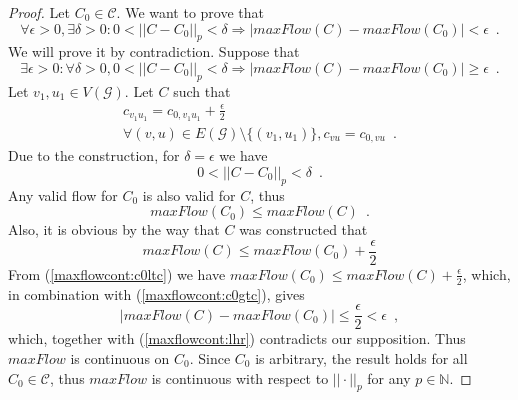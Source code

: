 \begin{proof}
   Let $C_0 \in \mathcal{C}$. We want to prove that
   \begin{equation*}
      \forall \epsilon > 0, \exists \delta > 0 : 0 < ||C - C_0||_p < \delta
      \Rightarrow |maxFlow\left(C\right) - maxFlow\left(C_0\right)| < \epsilon \enspace.
   \end{equation*}
   We will prove it by contradiction. Suppose that
   \begin{equation*}
      \exists \epsilon > 0 : \forall \delta > 0, 0 < ||C - C_0||_p < \delta
      \Rightarrow |maxFlow\left(C\right) - maxFlow\left(C_0\right)| \geq \epsilon \enspace.
   \end{equation*}
   Let $v_1, u_1 \in V\left(\mathcal{G}\right)$. Let $C$ such that
   \begin{equation*}
   \begin{gathered}
      c_{v_1u_1} = c_{0,v_1u_1} + \frac{\epsilon}{2} \\
      \forall \left(v, u\right) \in E\left(\mathcal{G}\right) \setminus \{\left(v_1, u_1\right)\}, c_{vu} = c_{0,vu}
      \enspace.
   \end{gathered}
   \end{equation*}
   Due to the construction, for $\delta = \epsilon$ we have
   \begin{equation}
   \label{maxflowcont:lhr}
      0 < ||C - C_0||_p < \delta \enspace.
   \end{equation}
   Any valid flow for $C_0$ is also valid for $C$, thus
   \begin{equation}
   \label{maxflowcont:c0ltc}
      maxFlow\left(C_0\right) \leq maxFlow\left(C\right) \enspace.
   \end{equation}
   Also, it is obvious by the way that $C$ was constructed that
   \begin{equation}
   \label{maxflowcont:c0gtc}
      maxFlow\left(C\right) \leq maxFlow\left(C_0\right) + \frac{\epsilon}{2}
   \end{equation}
   From (\ref{maxflowcont:c0ltc}) we have $maxFlow\left(C_0\right) \leq maxFlow\left(C\right) + \frac{\epsilon}{2}$, which,
   in combination with (\ref{maxflowcont:c0gtc}), gives 
   \begin{equation*}
      |maxFlow\left(C\right) - maxFlow\left(C_0\right)| \leq \frac{\epsilon}{2} < \epsilon \enspace,
   \end{equation*}
   which, together with (\ref{maxflowcont:lhr}) contradicts our supposition. Thus $maxFlow$ is continuous on $C_0$. Since
   $C_0$ is arbitrary, the result holds for all $C_0 \in \mathcal{C}$, thus $maxFlow$ is continuous with respect to
   $||\cdot||_p$ for any $p \in \mathbb{N}$.
\end{proof}
